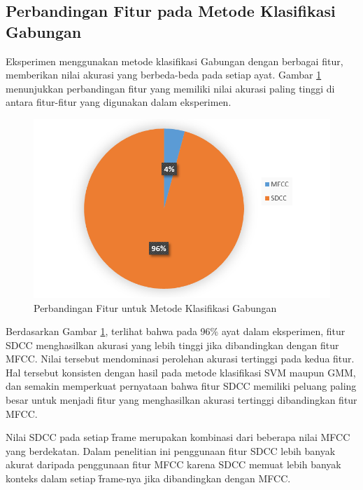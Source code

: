   
  \subsection{Perbandingan Fitur pada Metode Klasifikasi Gabungan}
  Eksperimen menggunakan metode klasifikasi Gabungan dengan berbagai fitur, memberikan nilai akurasi yang berbeda-beda pada setiap ayat. Gambar \ref{fig:pieclass2} menunjukkan perbandingan fitur yang memiliki nilai akurasi paling tinggi di antara fitur-fitur yang digunakan dalam eksperimen.

  \begin{figure}
    \centering
    \includegraphics[width=0.9\linewidth]{pics/pieclass2}
    \caption{Perbandingan Fitur untuk Metode Klasifikasi Gabungan}
    \label{fig:pieclass2}
  \end{figure}

  Berdasarkan Gambar \ref{fig:pieclass2}, terlihat bahwa pada 96\% ayat dalam eksperimen, fitur SDCC menghasilkan akurasi yang lebih tinggi jika dibandingkan dengan fitur MFCC. Nilai tersebut mendominasi perolehan akurasi tertinggi pada kedua fitur. Hal tersebut konsisten dengan hasil pada metode klasifikasi SVM maupun GMM, dan semakin memperkuat pernyataan bahwa fitur SDCC memiliki peluang paling besar untuk menjadi fitur yang menghasilkan akurasi tertinggi dibandingkan fitur MFCC.

  Nilai SDCC pada setiap \f{frame} merupakan kombinasi dari beberapa nilai MFCC yang berdekatan. Dalam penelitian ini penggunaan fitur SDCC lebih banyak akurat daripada penggunaan fitur MFCC karena SDCC memuat lebih banyak konteks dalam setiap \f{frame}-nya jika dibandingkan dengan MFCC.











